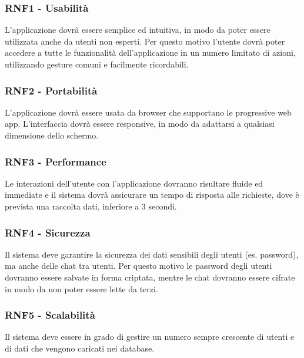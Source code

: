 \documentclass[12pt, a4paper]{article}
\begin{document}
\subsubsection*{\hypertarget{RNF1}{RNF1 - Usabilità}}

L'applicazione dovrà essere semplice ed intuitiva, in modo da poter essere utilizzata anche da utenti non esperti. Per questo motivo l'utente dovrà poter accedere a tutte le funzionalità dell'applicazione in un numero limitato di azioni, utilizzando gesture comuni e facilmente ricordabili.

\subsubsection*{\hypertarget{RNF2}{RNF2 - Portabilità}}

L'applicazione dovrà essere usata da browser che supportano le progressive web app. L'interfaccia dovrà essere responsive, in modo da adattarsi a qualsiasi dimensione dello schermo.

\subsubsection*{\hypertarget{RNF3}{RNF3 - Performance}}

Le interazioni dell'utente con l'applicazione dovranno risultare fluide ed immediate e il sistema dovrà assicurare un tempo di risposta alle richieste, dove è prevista una raccolta dati, inferiore a 3 secondi.


\subsubsection*{\hypertarget{RNF4}{RNF4 - Sicurezza}}

Il sistema deve garantire la sicurezza dei dati sensibili degli utenti (es. password), ma anche delle chat tra utenti. Per questo motivo le password degli utenti dovranno essere salvate in forma criptata, mentre le chat dovranno essere cifrate in modo da non poter essere lette da terzi.


\subsubsection*{\hypertarget{RNF5}{RNF5 - Scalabilità}}

Il sistema deve essere in grado di gestire un numero sempre crescente di utenti e di dati che vengono caricati nei database.
\end{document}
